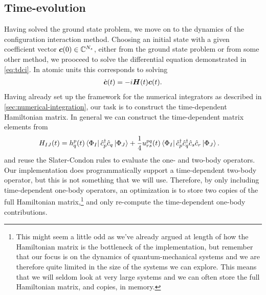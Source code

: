        \subsection{Time-evolution}
            Having solved the ground state problem, we move on to the dynamics
            of the configuration interaction method.
            Choosing an initial state with a given coefficient vector
            $\boldsymbol{c}(0) \in \mathbb{C}^{N_s}$, either from the ground state
            problem or from some other method, we prooceed to solve the
            differential equation demonstrated in \autoref{eq:tdci}.
            In atomic units this corresponds to solving
            \begin{align}
                \dot{\boldsymbol{c}}(t) = -i\boldsymbol{H}(t)\boldsymbol{c}(t).
            \end{align}
            Having already set up the framework for the numerical integrators as
            described in \autoref{sec:numerical-integration}, our task is to
            construct the time-dependent Hamiltonian matrix.
            In general we can construct the time-dependent matrix elements from
            \begin{align}
                H_{IJ}(t)
                &=
                h^{p}_{q}(t)
                \bra{\Phi_I}\hat{c}_{p}^{\dagger}\hat{c}_{q}\ket{\Phi_J}
                + \frac{1}{4}u^{pq}_{rs}(t)
                \bra{\Phi_I}\hat{c}_{p}^{\dagger}\hat{c}_{q}^{\dagger}\hat{c}_{s}\hat{c}_{r}\ket{\Phi_J}.
            \end{align}
            and reuse the Slater-Condon rules to evaluate the one- and two-body
            operators.
            Our implementation does programmatically support a time-dependent
            two-body operator, but this is not something that we will use.
            Therefore, by only including time-dependent one-body operators, an
            optimization is to store two copies of the full Hamiltonian
            matrix,\footnote{%
                This might seem a little odd as we've already argued at length
                of how the Hamiltonian matrix is the bottleneck of the
                implementation, but remember that our focus is on the dynamics
                of quantum-mechanical systems and we are therefore quite limited
                in the size of the systems we can explore.
                This means that we will seldom look at very large systems and we
                can often store the full Hamiltonian matrix, and copies, in
                memory.
            }
            and only re-compute the time-dependent one-body contributions.
